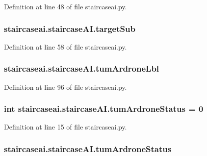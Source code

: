 Definition at line 48 of file staircaseai.\-py.

\hypertarget{classstaircaseai_1_1staircaseAI_aa94cc788015f2cf55e5e0755b95341fe}{
\subsubsection[{target\-Sub}]{\setlength{\rightskip}{0pt plus 5cm}staircaseai.\-staircase\-A\-I.\-target\-Sub}}\label{classstaircaseai_1_1staircaseAI_aa94cc788015f2cf55e5e0755b95341fe}


Definition at line 58 of file staircaseai.\-py.

\hypertarget{classstaircaseai_1_1staircaseAI_a6b07562110670bd39dfaa76c3d289f4c}{
\subsubsection[{tum\-Ardrone\-Lbl}]{\setlength{\rightskip}{0pt plus 5cm}staircaseai.\-staircase\-A\-I.\-tum\-Ardrone\-Lbl}}\label{classstaircaseai_1_1staircaseAI_a6b07562110670bd39dfaa76c3d289f4c}


Definition at line 96 of file staircaseai.\-py.

\hypertarget{classstaircaseai_1_1staircaseAI_a94e2925e1c0eca37cbdbfc7201dabcb6}{
\subsubsection[{tum\-Ardrone\-Status}]{\setlength{\rightskip}{0pt plus 5cm}int staircaseai.\-staircase\-A\-I.\-tum\-Ardrone\-Status = 0\hspace{0.3cm}{\ttfamily [static]}}}\label{classstaircaseai_1_1staircaseAI_a94e2925e1c0eca37cbdbfc7201dabcb6}


Definition at line 15 of file staircaseai.\-py.

\hypertarget{classstaircaseai_1_1staircaseAI_af27dfa875e03ac7646b25a655318e7e6}{
\subsubsection[{tum\-Ardrone\-Status}]{\setlength{\rightskip}{0pt plus 5cm}staircaseai.\-staircase\-A\-I.\-tum\-Ardrone\-Status}}\label{classstaircaseai_1_1staircaseAI_af27dfa875e03ac7646b25a655318e7e6}


